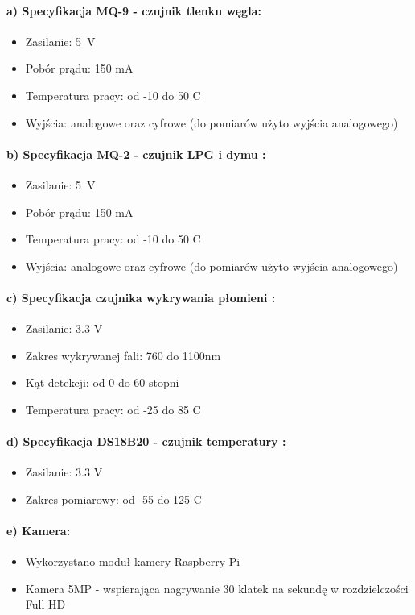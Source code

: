 \paragraph{a) Specyfikacja MQ-9 - czujnik tlenku węgla\cite{specyfikacjaMQ-9}:}
\begin{itemize} 
\item Zasilanie: 5~V
\item Pobór prądu: 150 mA
\item Temperatura pracy: od -10 do 50 \textdegree{}C
\item Wyjścia: analogowe oraz cyfrowe (do pomiarów użyto wyjścia analogowego)
\end{itemize}
\paragraph{b) Specyfikacja MQ-2 - czujnik LPG i dymu \protect\cite{specyfikacjaMQ-2}:}
\begin{itemize} 
\item Zasilanie: 5~V
\item Pobór prądu: 150 mA
\item Temperatura pracy: od -10 do 50 \textdegree{}C
\item Wyjścia: analogowe oraz cyfrowe (do pomiarów użyto wyjścia analogowego)
\end{itemize}
\paragraph{c) Specyfikacja czujnika wykrywania płomieni \protect\cite{specyfikacjaFlame}:}
\begin{itemize} 
\item Zasilanie: 3.3 V
\item Zakres wykrywanej fali: 760 do 1100nm
\item Kąt detekcji: od 0 do 60 stopni
\item Temperatura pracy: od -25 do 85 \textdegree{}C
\end{itemize}
\paragraph{d) Specyfikacja DS18B20 - czujnik temperatury \protect\cite{specyfikacjaTemp}:}
\begin{itemize} 
\item Zasilanie: 3.3 V
\item Zakres pomiarowy: od -55 do 125 \textdegree{}C
\end{itemize}
\paragraph{e) Kamera:}
\begin{itemize} 
\item Wykorzystano moduł kamery Raspberry Pi
\item Kamera 5MP - wspierająca nagrywanie 30 klatek na sekundę w rozdzielczości Full HD
\end{itemize}
